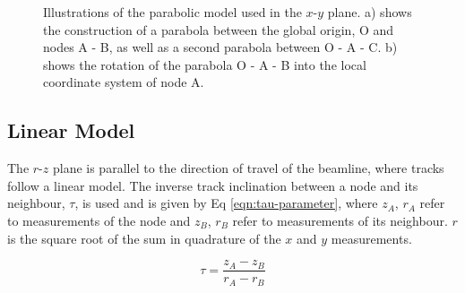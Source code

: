 \begin{figure}[htbp!] 
    \centering
    \hfill%
    \caption{Illustrations of the parabolic model used in the $x$-$y$ plane. a) shows the construction of a parabola between the global origin, O and nodes A - B, as well as a second parabola between O - A - C. b) shows the rotation of the parabola O - A - B into the local coordinate system of node A.}
    \label{fig:gnn-parabolic-model}
\end{figure}


\subsection{Linear Model}
\label{linear-state}

The $r$-$z$ plane is parallel to the direction of travel of the beamline, where tracks follow a linear model. The inverse track inclination between a node and its neighbour, $\tau$, is used and is given by Eq \eqref{eqn:tau-parameter}, where $z_A$, $r_A$ refer to measurements of the node and $z_B$, $r_B$ refer to measurements of its neighbour. $r$ is the square root of the sum in quadrature of the $x$ and $y$ measurements.

\begin{equation}
\tau = \frac{z_A - z_B}{r_A - r_B}
\label{eqn:tau-parameter}
\end{equation}

